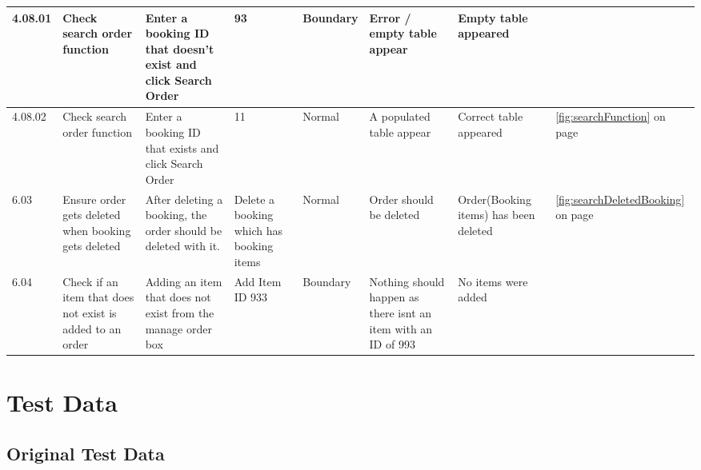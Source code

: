 \begin{landscape}
\begin{center}
\begin{longtable}{|p{1.5cm}|p{2.5cm}|p{2.5cm}|p{2cm}|p{2cm}|p{2cm}|p{2cm}|p{2cm}|}
           4.08.01 & Check search order function & Enter a booking ID that doesn't exist and click Search Order & 93 &  Boundary &  Error / empty table appear &  Empty table appeared  &  \\ \hline
           4.08.02& Check search order function & Enter a booking ID that exists and click Search Order & 11 &  Normal &  A populated table appear & Correct table appeared   & \ref{fig:searchFunction} on page \pageref{fig:searchFunction} \\ \hline
	6.03 & Ensure order gets deleted when booking gets deleted & After deleting a booking, the order should be deleted with it.  & Delete a booking which has booking items   & Normal & Order should be deleted &Order(Booking items) has been deleted &\ref{fig:searchDeletedBooking} on page \pageref{fig:searchDeletedBooking} \\ \hline
	6.04 & Check if an item that does not exist is added to an order & Adding an item that does not exist from the manage order box  & Add Item ID 933 & Boundary & Nothing should happen as there isnt an item with an ID of 993 & No items were added& \\ \hline


    \end{longtable}
\end{center}
\end{landscape}

\section{Test Data}

\subsection{Original Test Data}

